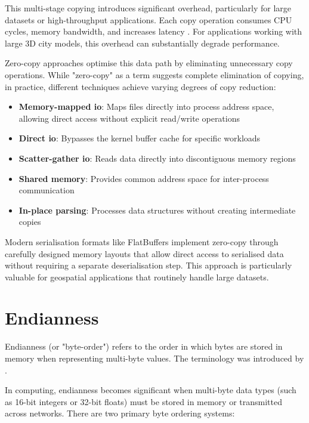 This multi-stage copying introduces significant overhead, particularly for large datasets or high-throughput applications. Each copy operation consumes CPU cycles, memory bandwidth, and increases latency \citep{song2012performance}. For applications working with large 3D city models, this overhead can substantially degrade performance.

Zero-copy approaches optimise this data path by eliminating unnecessary copy operations. While "zero-copy" as a term suggests complete elimination of copying, in practice, different techniques achieve varying degrees of copy reduction:

\begin{itemize}
  \item \textbf{Memory-mapped \ac{io}}: Maps files directly into process address space, allowing direct access without explicit read/write operations
  \item \textbf{Direct \ac{io}}: Bypasses the kernel buffer cache for specific workloads
  \item \textbf{Scatter-gather \ac{io}}: Reads data directly into discontiguous memory regions
  \item \textbf{Shared memory}: Provides common address space for inter-process communication
  \item \textbf{In-place parsing}: Processes data structures without creating intermediate copies
\end{itemize}

Modern serialisation formats like FlatBuffers implement zero-copy through carefully designed memory layouts that allow direct access to serialised data without requiring a separate deserialisation step. This approach is particularly valuable for geospatial applications that routinely handle large datasets.
\section{Endianness}
\label{tb:endianness}
Endianness (or "byte-order") refers to the order in which bytes are stored in memory when representing multi-byte values. The terminology was introduced by \citet{danny_cohen_1981}.

In computing, endianness becomes significant when multi-byte data types (such as 16-bit integers or 32-bit floats) must be stored in memory or transmitted across networks. There are two primary byte ordering systems:

